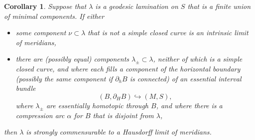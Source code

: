 \documentclass[12pt]{amsart}
\newtheorem{corollary}[theorem]{Corollary}
\theoremstyle{definition}
\theoremstyle{remark}
\begin{document}
\begin{corollary}\label{hauslimitcor}
Suppose that $\lambda$ is a geodesic lamination on $S$ that is a finite union of minimal components. If either
\begin{itemize}
	\item some component $\nu \subset \lambda$ that is not a simple closed curve is an intrinsic limit of meridians,
	\item there are (possibly equal) components $\lambda_\pm \subset \lambda$, neither of which is a simple closed curve, and where each fills a component of the horizontal boundary (possibly the same component if $\partial_h B$ is connected) of an essential interval bundle $$(B,\partial_H B) \hookrightarrow (M,S),$$ where $\lambda_\pm$ are essentially homotopic through $B$, and where there is a compression arc $\alpha$ for $B$ that is disjoint from $\lambda$, 
\end{itemize}
then $\lambda$ is strongly commensurable to a Hausdorff limit of meridians.
\end{corollary}
\end{document}
